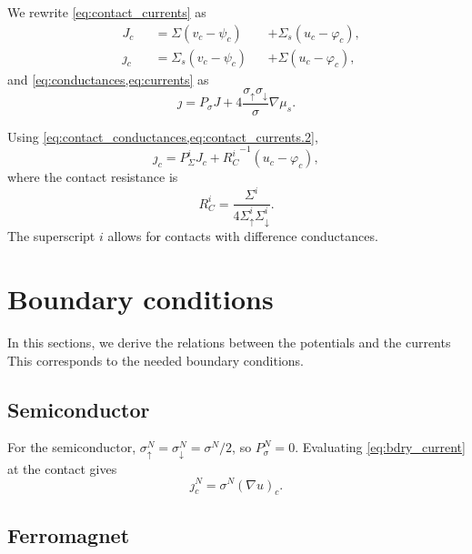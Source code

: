 We rewrite \cref{eq:contact_currents} as
\begin{subequations}\label{eq:contact_currents.2}
  \begin{alignat}{3}
    \label{eq:contact_currents.2.current}
    & J_c && = Σ   \left( v_c - ψ_c \right) && + Σ_s \left( u_c - φ_c \right),
    \\
    \label{eq:contact_currents.2.spincurrent}
    & ȷ_c && = Σ_s \left( v_c - ψ_c \right) && + Σ   \left( u_c - φ_c \right),
  \end{alignat}
\end{subequations}
and \cref{eq:conductances,eq:currents} as
\begin{equation}
  \label{eq:bdry_current}
  ȷ = P_σ J + 4 \frac{σ_↑ σ_↓}{σ} ∇μ_s.
\end{equation}

Using \cref{eq:contact_conductances,eq:contact_currents.2},
\begin{equation}
  \label{eq:bdry_current_contact}
  ȷ_c = P_Σ^i J_c + {R_C^i}^{-1} \left( u_c - φ_c \right),
\end{equation}
where the contact resistance is
\begin{equation}
  \label{eq:contact.resistance}
  R_C^i = \frac{Σ^i}{4 Σ_↑^i Σ_↓^i}.
\end{equation}
The superscript $i$ allows for contacts with difference conductances.

\section{Boundary conditions}

In this sections, we derive the relations between
the potentials and the currents
This corresponds to the needed boundary conditions.

\subsection{Semiconductor}

For the semiconductor, $σ^N_↑ = σ^N_↓ = σ^N / 2$, so $P_σ^N = 0$.
Evaluating \cref{eq:bdry_current} at the contact gives
\begin{equation}
  \label{eq:bdry_current.semiconductor}
  ȷ^N_c = σ^N {( ∇u )}_c.
\end{equation}

\subsection{Ferromagnet}

